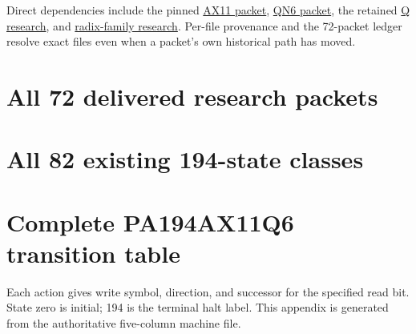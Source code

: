 \documentclass[10pt,letterpaper]{article}
\newcommand{\Repo}[2]{\href{https://github.com/VladimirReshetnikov/ProveIt/blob/4be5c6e3a10292a7466f5d3687e3b39615ff049b/#1}{#2}}
\begin{document}
Direct dependencies include the pinned
\Repo{docs/incoming/pa194_ax11_research_2026-11-14.zip}{AX11 packet},
\Repo{docs/incoming/pa194qn6_conpa_2026-11-14.zip}{QN6 packet},
the retained
\Repo{Computability/BusyBeaver/Research/PA/docs/pa194q_conpa_2026-11-13/README.txt}{Q research},
and
\Repo{Computability/BusyBeaver/Research/PA/docs/pa194_radix_family_2026-11-13/README.txt}{radix-family research}.
Per-file provenance and the 72-packet ledger resolve exact files even
when a packet's own historical path has moved.

\appendix
\clearpage
\section{All 72 delivered research packets}
\label{app:packets}

\clearpage
\section{All 82 existing 194-state classes}
\label{app:frontier}

\clearpage
\section{Complete PA194AX11Q6 transition table}
\label{app:table}
Each action gives write symbol, direction, and successor for the specified
read bit. State zero is initial; 194 is the terminal halt label. This
appendix is generated from the authoritative five-column machine file.

\end{document}

